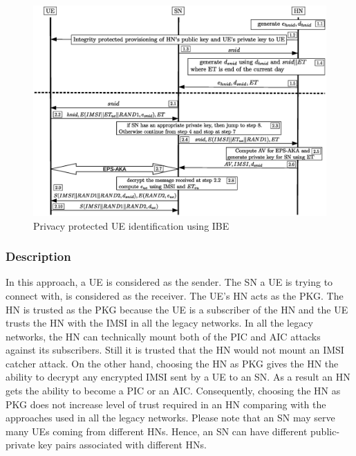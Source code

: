 \documentclass[runningheads,a4paper]{llncs} %
\begin{document}
\begin{figure}
\begin{center}
  \includegraphics[width=.98\textwidth]{solution_based_on_ibc.eps}
\caption{Privacy protected UE identification using IBE}
\label{fig:solution_ibc}       %
\end{center}
\end{figure}

\subsubsection{Description}
In this approach, a UE is considered as the sender. The SN a UE is trying to connect with, is considered as the receiver. The UE's HN acts as the PKG. The HN is trusted as the PKG because the UE is a subscriber of the HN and the UE trusts the HN with the IMSI in all the legacy networks. In all the legacy networks, the HN can technically mount both of the PIC and AIC attacks against its subscribers. Still it is trusted that the HN would not mount an IMSI catcher attack. On the other hand, choosing the HN as PKG gives the HN the ability to decrypt any encrypted IMSI sent by a UE to an SN. As a result an HN gets the ability to become a PIC or an AIC. Consequently, choosing the HN as PKG does not increase level of trust required in an HN comparing with the approaches used in all the legacy networks. Please note that an SN may serve many UEs coming from different HNs. Hence, an SN can have different public-private key pairs associated with different HNs. 
\end{document}
